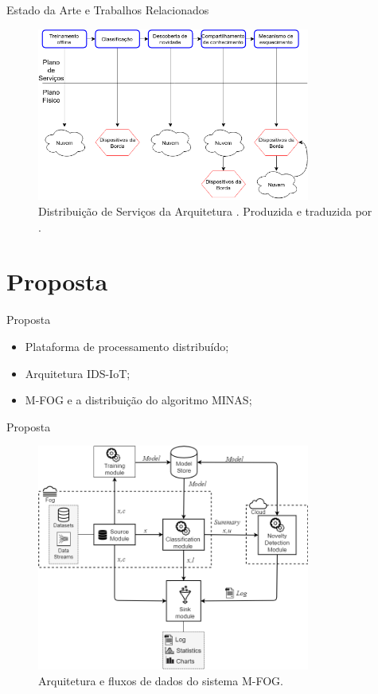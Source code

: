 \documentclass[aspectratio=43,10pt]{beamer}
\begin{document}
\begin{frame}[fragile]{Estado da Arte e Trabalhos Relacionados}
\begin{figure}[ht]
  \centering
  \includegraphics[width=0.8\textwidth]{figuras/idsa-iot-quali-004.png}
  \caption{Distribuição de Serviços da Arquitetura \idsiot.
  Produzida e traduzida por .}
  \label{fig:ids-iot}
\end{figure}
\end{frame}

\newcommand{\mfog}{sistema M-FOG\xspace}

\section{Proposta}
\begin{frame}[fragile]{Proposta}
\begin{itemize}
\item Plataforma de processamento distribuído;
\item Arquitetura IDS-IoT;
\item M-FOG e a distribuição do algoritmo MINAS;
\end{itemize}
\end{frame}

\begin{frame}[fragile]{Proposta}
\begin{figure}[h]
  \centering
  \includegraphics[width=0.8\textwidth]{figuras/mfog.png}
  \caption{Arquitetura e fluxos de dados do \mfog.}
  \label{fig:arch}
\end{figure}
\end{frame}
\end{document}
